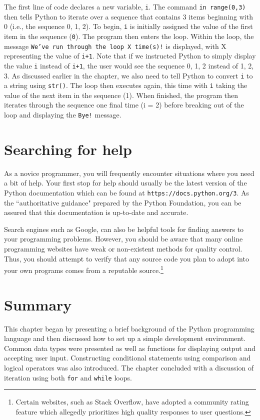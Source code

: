 \documentclass{book}
\begin{document}
The first line of code declares a new variable, \texttt{i}. The command \texttt{in range(0,3)} then tells Python to iterate over a sequence that contains 3 items beginning with 0 (i.e., the sequence 0, 1, 2). To begin, \texttt{i} is initially assigned the value of the first item in the sequence (\texttt{0}). The program then enters the loop. Within the loop, the message \texttt{We've run through the loop X time(s)!} is displayed, with X representing the value of \texttt{i+1}. Note that if we instructed Python to simply display the value \texttt{i} instead of \texttt{i+1}, the user would see the sequence 0, 1, 2 instead of 1, 2, 3. As discussed earlier in the chapter, we also need to tell Python to convert \texttt{i} to a string using \texttt{str()}. The loop then executes again, this time with \texttt{i} taking the value of the next item in the sequence (1). When finished, the program then iterates through the sequence one final time (i = 2) before breaking out of the loop and displaying the \texttt{Bye!} message.

\section{Searching for help}
As a novice programmer, you will frequently encounter situations where you need a bit of help. Your first stop for help should usually be the latest version of the Python documentation which can be found at \texttt{https://docs.python.org/3}. As the ``authoritative guidance" prepared by the Python Foundation, you can be assured that this documentation is up-to-date and accurate.

Search engines such as Google\texttrademark , can also be helpful tools for finding answers to your programming problems. However, you should be aware that many online programming websites have weak or non-existent methods for quality control. Thus, you should attempt to verify that any source code you plan to adopt into your own programs comes from a reputable source.\footnote{Certain websites, such as Stack Overflow\texttrademark , have adopted a community rating feature which allegedly prioritizes high quality responses to user questions.}
\section{Summary}
This chapter began by presenting a brief background of the Python programming language and then discussed how to set up a simple development environment. Common data types were presented as well as functions for displaying output and accepting user input. Constructing conditional statements using comparison and logical operators was also introduced. The chapter concluded with a discussion of iteration using both \texttt{for} and \texttt{while} loops.
\end{document}
